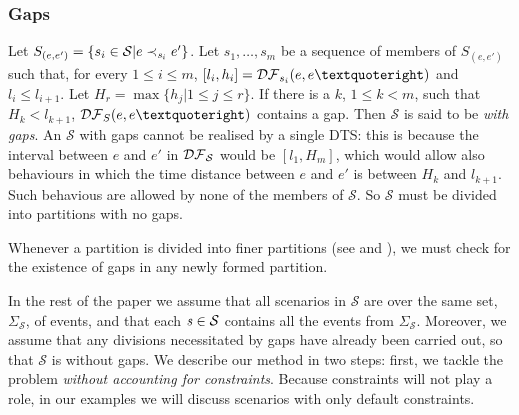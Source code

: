 \subsubsection{Gaps}\label{paragraph-gaps}
Let $S_{(e, e')}=\{s_i\in \mathcal{S}|e\prec_{\mathit{s}_i}e'\}$.
Let $s_1,\dots,s_m$ be a sequence of members of $S_{(e, e')}$ such
that, for every $1\leq i\leq m$, $[l_i, h_i]=\DF{s_i}(e, e’)$
and $l_i \leq l_{i+1}$.
Let $H_{r}=\max \{h_j|1\leq j \leq r\}$.
If there is a $k$, $1 \leq k < m$, such that
$H_{k} < l_{k+1}$, $\DF{S}(e, e’)$ contains a gap.
Then $\mathcal{S}$ is said to be \emph{with gaps}.
An $\mathcal{S}$ with gaps cannot be realised by a single DTS:
this is because the interval between $e$ and $e'$ in
$\mathcal{DF}_{\mathcal{S}}$ would be
$[l_1,H_{m}]$, which would allow also behaviours
 in which the time distance
 between $e$ and $e'$ is between $H_k$ and $l_{k+1}$. Such behavious are
  allowed by none of the members of $\mathcal{S}$.
  So $\mathcal{S}$ must be divided into partitions with no gaps.

Whenever a partition is divided into finer partitions (see 
 and ), we must check for the existence of gaps in any
 newly formed partition.%



In the rest of the paper we assume that all scenarios in
$\mathcal{S}$ are over the same set, $\Sigma_{\mathcal{S}}$, of
events, and that each $\mathit{s}\in\mathcal{S}$
contains all the events from $\Sigma_{\mathcal{S}}$.
Moreover, we assume that any divisions necessitated by
gaps have already been carried out, so that $\mathcal{S}$ is without gaps.
We describe our method in two steps:
first, we tackle the
problem \emph{without accounting for constraints}.
Because constraints will not play a role,
in our examples we will discuss scenarios with only default constraints.
